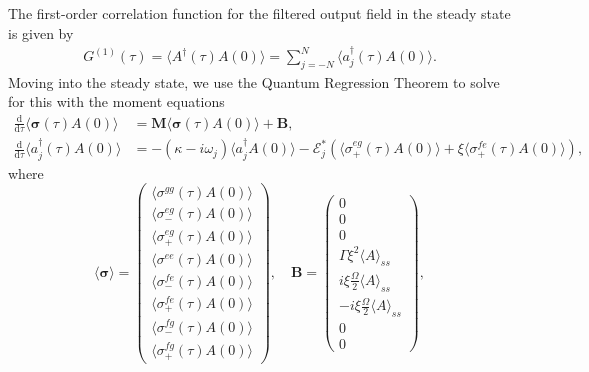\documentclass{article}
\newcommand{\ddtau}{\frac{\mathrm{d}}{\mathrm{d}\tau}}
\begin{document}
The first-order correlation function for the filtered output field in the steady state is given by
\begin{align}
	G^{(1)}(\tau) = \langle A^{\dagger}(\tau) A(0) \rangle = \sum_{j=-N}^{N} \langle a^{\dagger}_{j} (\tau) A(0) \rangle.
\end{align}
Moving into the steady state, we use the Quantum Regression Theorem to solve for this with the moment equations
\begin{subequations}
	\begin{align}
		\ddtau \langle \bm{\sigma}(\tau) A(0) \rangle &= \bm{M} \langle \bm{\sigma}(\tau) A(0) \rangle + \bm{B}, \\
		\ddtau \langle a^{\dagger}_{j}(\tau) A(0) \rangle &= -\left( \kappa - i \omega_{j} \right) \langle a^{\dagger}_{j} A(0) \rangle - \mathcal{E}_{j}^{*} \left( \langle \sigma^{eg}_{+}(\tau) A(0) \rangle + \xi \langle \sigma^{fe}_{+}(\tau) A(0) \rangle \right),
	\end{align}
\end{subequations}
where
\begin{equation}
	\langle \bm{\sigma} \rangle =
	\begin{pmatrix}
		\langle \sigma^{gg}(\tau) A(0) \rangle \\
		\langle \sigma^{eg}_{-}(\tau) A(0) \rangle \\
		\langle \sigma^{eg}_{+}(\tau) A(0) \rangle \\
		\langle \sigma^{ee}(\tau) A(0) \rangle \\
		\langle \sigma^{fe}_{-}(\tau) A(0) \rangle \\
		\langle \sigma^{fe}_{+}(\tau) A(0) \rangle \\
		\langle \sigma^{fg}_{-}(\tau) A(0) \rangle \\
		\langle \sigma^{fg}_{+}(\tau) A(0) \rangle
	\end{pmatrix}, \quad \bm{B} =
	\begin{pmatrix}
		0 \\
		0 \\
		0 \\
		\Gamma \xi^{2} \langle A \rangle_{ss} \\
		i \xi \frac{\Omega}{2} \langle A \rangle_{ss} \\
		-i \xi \frac{\Omega}{2} \langle A \rangle_{ss} \\
		0 \\
		0
	\end{pmatrix},
\end{equation}
\end{document}
